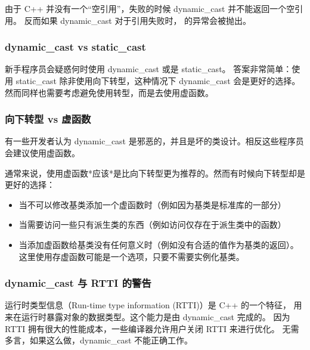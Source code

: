 \documentclass[../../LearnCpp.tex]{subfiles}
\begin{document}
由于 C++ 并没有一个“空引用”，失败的时候 dynamic\_cast 并不能返回一个空引用。
反而如果 dynamic\_cast 对于引用失败时， 的异常会被抛出。

\subsubsection*{dynamic\_cast vs static\_cast}

新手程序员会疑惑何时使用 dynamic\_cast 或是 static\_cast。
答案非常简单：使用 static\_cast 除非使用向下转型，这种情况下 dynamic\_cast 会是更好的选择。
然而同样也需要考虑避免使用转型，而是去使用虚函数。

\subsubsection*{向下转型 vs 虚函数}

有一些开发者认为 dynamic\_cast 是邪恶的，并且是坏的类设计。相反这些程序员会建议使用虚函数。

通常来说，使用虚函数*应该*是比向下转型更为推荐的。然而有时候向下转型却是更好的选择：

\begin{itemize}
  \item 当不可以修改基类添加一个虚函数时（例如因为基类是标准库的一部分）
  \item 当需要访问一些只有派生类的东西（例如访问仅存在于派生类中的函数）
  \item 当添加虚函数给基类没有任何意义时（例如没有合适的值作为基类的返回）。
        这里使用存虚函数可能是一个选项，只要不需要实例化基类。
\end{itemize}

\subsubsection*{dynamic\_cast 与 RTTI 的警告}

运行时类型信息（Run-time type information (RTTI)）是 C++ 的一个特征，
用来在运行时暴露对象的数据类型。这个能力是由 dynamic\_cast 完成的。
因为 RTTI 拥有很大的性能成本，一些编译器允许用户关闭 RTTI 来进行优化。
无需多言，如果这么做，dynamic\_cast 不能正确工作。
\end{document}

